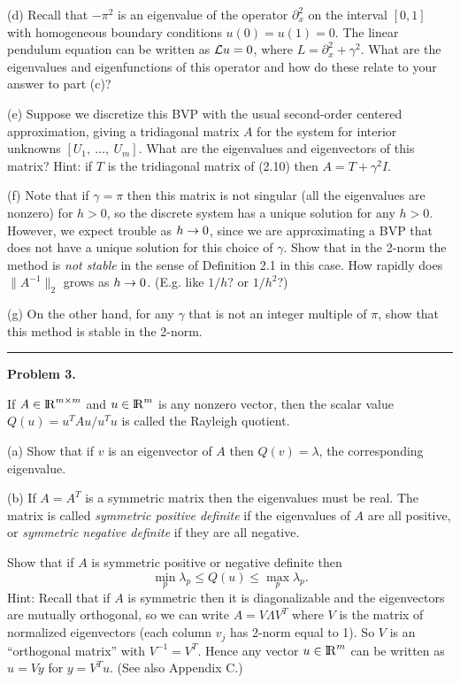 \documentclass[10pt]{article}
\begin{document}
(d) Recall that $-\pi^2$ is an eigenvalue of the operator
$\partial_x^2$ on the interval $[0,1]$ with homogeneous boundary conditions
$u(0)=u(1)=0$.  The linear pendulum equation can be written as ${\cal L}u = 0$,
where $L = \partial_x^2 + \gamma^2$.
What are the eigenvalues and eigenfunctions of this operator and how do
these relate to your answer to part (c)?

(e) Suppose we discretize this BVP with the usual second-order centered 
approximation, giving a tridiagonal matrix $A$ for the system for interior
unknowns $[U_1,~\ldots,~U_m]$.  What are the eigenvalues and eigenvectors of
this matrix?  Hint: if $T$ is the tridiagonal matrix of (2.10) then 
$A = T + \gamma^2 I$.

(f) Note that if $\gamma = \pi$ then this matrix is not singular (all the
eigenvalues are nonzero) for $h>0$, 
so the discrete system has a unique solution for any $h>0$.
However, we expect trouble as $h \rightarrow 0$, since we are approximating a BVP
that does not have a unique solution for this choice of $\gamma$.  Show that
in the 2-norm the method is {\em not stable} in the sense of Definition 2.1 
in this case.  How rapidly does $\|A^{-1}\|_2$ grows as $h\rightarrow 0$.
(E.g. like $1/h$?  or $1/h^2$?)

(g) On the other hand, for any $\gamma$ that is not an
integer multiple of $\pi$, show that this method is stable in the 2-norm.




\vskip 1cm
\hrule
{\bf Problem 3.}

If $A \in {{\rm l} \kern -.15em {\rm R} }^{m \times m}$ and $u\in{{\rm l} \kern -.15em {\rm R} }^m$ is any nonzero vector, then 
the scalar value $Q(u) = u^TAu / u^Tu$ is called the Rayleigh quotient.

(a) Show that if $v$ is an eigenvector of $A$ then $Q(v) = \lambda$, the
corresponding eigenvalue.

(b) If $A = A^T$ is a symmetric matrix then the eigenvalues must be real. 
The  matrix is called {\em
symmetric positive definite} if the eigenvalues of $A$ are all positive,
or {\em symmetric negative definite} if they are all negative. 


Show that if $A$ is symmetric positive or negative definite then
\begin{equation}\label{Qbound}
\min_p  \lambda_p \leq Q(u) \leq \max_p \lambda_p.
\end{equation}
Hint: Recall that if $A$ is symmetric then it is diagonalizable and the
eigenvectors are mutually orthogonal, so we can write $A = V\Lambda V^T$
where $V$ is the matrix of normalized eigenvectors (each column $v_j$ has
2-norm equal to 1). So $V$ is an ``orthogonal matrix'' with  
$V^{-1} = V^T$. Hence any vector $u\in{{\rm l} \kern -.15em {\rm R} }^m$ can be written as $u=Vy$ for
$y = V^Tu$.  (See also Appendix C.)
\end{document}
